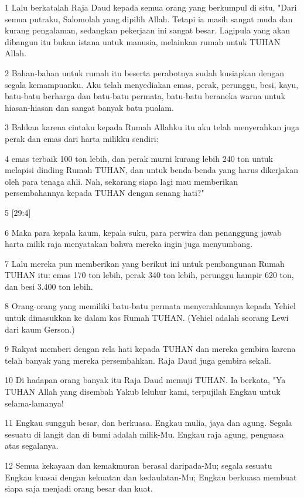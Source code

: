 \par 1 Lalu berkatalah Raja Daud kepada semua orang yang berkumpul di situ, "Dari semua putraku, Salomolah yang dipilih Allah. Tetapi ia masih sangat muda dan kurang pengalaman, sedangkan pekerjaan ini sangat besar. Lagipula yang akan dibangun itu bukan istana untuk manusia, melainkan rumah untuk TUHAN Allah.
\par 2 Bahan-bahan untuk rumah itu beserta perabotnya sudah kusiapkan dengan segala kemampuanku. Aku telah menyediakan emas, perak, perunggu, besi, kayu, batu-batu berharga dan batu-batu permata, batu-batu beraneka warna untuk hiasan-hiasan dan sangat banyak batu pualam.
\par 3 Bahkan karena cintaku kepada Rumah Allahku itu aku telah menyerahkan juga perak dan emas dari harta milikku sendiri:
\par 4 emas terbaik 100 ton lebih, dan perak murni kurang lebih 240 ton untuk melapisi dinding Rumah TUHAN, dan untuk benda-benda yang harus dikerjakan oleh para tenaga ahli. Nah, sekarang siapa lagi mau memberikan persembahannya kepada TUHAN dengan senang hati?"
\par 5 [29:4]
\par 6 Maka para kepala kaum, kepala suku, para perwira dan penanggung jawab harta milik raja menyatakan bahwa mereka ingin juga menyumbang.
\par 7 Lalu mereka pun memberikan yang berikut ini untuk pembangunan Rumah TUHAN itu: emas 170 ton lebih, perak 340 ton lebih, perunggu hampir 620 ton, dan besi 3.400 ton lebih.
\par 8 Orang-orang yang memiliki batu-batu permata menyerahkannya kepada Yehiel untuk dimasukkan ke dalam kas Rumah TUHAN. (Yehiel adalah seorang Lewi dari kaum Gerson.)
\par 9 Rakyat memberi dengan rela hati kepada TUHAN dan mereka gembira karena telah banyak yang mereka persembahkan. Raja Daud juga gembira sekali.
\par 10 Di hadapan orang banyak itu Raja Daud memuji TUHAN. Ia berkata, "Ya TUHAN Allah yang disembah Yakub leluhur kami, terpujilah Engkau untuk selama-lamanya!
\par 11 Engkau sungguh besar, dan berkuasa. Engkau mulia, jaya dan agung. Segala sesuatu di langit dan di bumi adalah milik-Mu. Engkau raja agung, penguasa atas segalanya.
\par 12 Semua kekayaan dan kemakmuran berasal daripada-Mu; segala sesuatu Engkau kuasai dengan kekuatan dan kedaulatan-Mu; Engkau berkuasa membuat siapa saja menjadi orang besar dan kuat.
